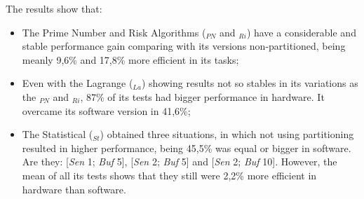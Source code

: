         The results show that:
        \begin{itemize}
            \item 
            The Prime Number and Risk Algorithms (\Ss$_{PN}$ and \Ss$_{Ri}$) have a considerable and stable performance gain comparing with its versions non-partitioned, being meanly 9,6\% and 17,8\% more efficient in its tasks;
            
            \item 
            Even with the Lagrange (\Ss$_{La}$) showing results not so stables in its variations as the \Ss$_{PN}$ and \Ss$_{Ri}$, 87\% of its tests had bigger performance in hardware.
            It overcame its software version in 41,6\%;
            
            \item 
            The Statistical (\Ss$_{St}$) obtained three situations, in which not using partitioning resulted in higher performance, being 45,5\% was equal or bigger in software.
            Are they: [\textit{Sen} 1; \textit{Buf} 5], [\textit{Sen} 2; \textit{Buf} 5] and [\textit{Sen} 2; \textit{Buf} 10]. 
            However, the mean of all its tests shows that they still were 2,2\% more efficient in hardware than software.
        \end{itemize}
    
